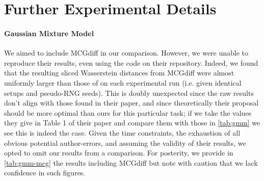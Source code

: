 \newpage

\section{Further Experimental Details} \label{sec:experimental-extra}

\paragraph{Gaussian Mixture Model} We aimed to include MCGdiff
\parencite{cardosoMonteCarloGuided2023} in our comparison. However, we were unable to reproduce
their results, even using the code on their repository. Indeed, we found that the resulting sliced
Wasserstein distances from MCGdiff were almost uniformly larger than those of
 on each experimental run (i.e. given identical setups and pseudo-RNG seeds). This
is doubly unexpected since the raw results don't align with those found in their paper,
and since theoretically their proposal should be more optimal than ours for this particular task;
if we take the values they give in Table 1 of their paper and compare them with those in
\autoref{tab:gmm} we see this is indeed the case. Given the time constraints, the exhaustion of all
obvious potential author-errors, and assuming the validity of their results, we opted to omit our
results from a comparison. For posterity, we provide in \autoref{tab:gmm-mcg} the results including
MCGdiff but note with caution that we lack confidence in such figures.

